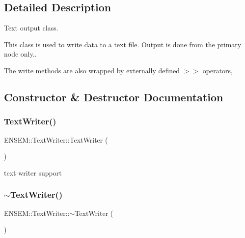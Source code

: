 \subsection{Detailed Description}
Text output class. 

This class is used to write data to a text file. Output is done from the primary node only..

The write methods are also wrapped by externally defined $>$$>$ operators, 

\subsection{Constructor \& Destructor Documentation}
\mbox{\label{classENSEM_1_1TextWriter_ad0b4ad57a3e91011920a473244447cac}} 
\subsubsection{\texorpdfstring{TextWriter()}{TextWriter()}\hspace{0.1cm}{\footnotesize\ttfamily [1/4]}}
{\footnotesize\ttfamily E\+N\+S\+E\+M\+::\+Text\+Writer\+::\+Text\+Writer (\begin{DoxyParamCaption}{ }\end{DoxyParamCaption})}



text writer support 

\mbox{\label{classENSEM_1_1TextWriter_a2aa3ba4260c005b4a2910046448cc193}} 
\subsubsection{\texorpdfstring{$\sim$TextWriter()}{~TextWriter()}\hspace{0.1cm}{\footnotesize\ttfamily [1/2]}}
{\footnotesize\ttfamily E\+N\+S\+E\+M\+::\+Text\+Writer\+::$\sim$\+Text\+Writer (\begin{DoxyParamCaption}{ }\end{DoxyParamCaption})}

